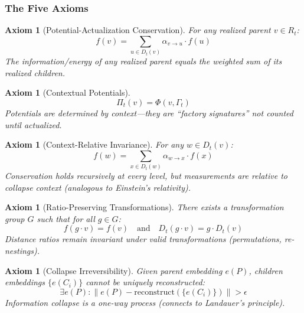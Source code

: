 \documentclass[11pt,a4paper]{article}
\newtheorem{axiom}[theorem]{Axiom}
\newcommand{\norm}[1]{\|#1\|}
\begin{document}
\subsubsection{The Five Axioms}

\begin{axiom}[Potential-Actualization Conservation]
\label{ax:pac}
For any realized parent $v \in R_t$:
\begin{equation}
f(v) = \sum_{u \in D_t(v)} \alpha_{v \to u} \cdot f(u)
\end{equation}
The information/energy of any realized parent equals the weighted sum of its realized children.
\end{axiom}

\begin{axiom}[Contextual Potentials]
\label{ax:context}
\begin{equation}
\Pi_t(v) = \Phi(v, \Gamma_t)
\end{equation}
Potentials are determined by context---they are ``factory signatures'' not counted until actualized.
\end{axiom}

\begin{axiom}[Context-Relative Invariance]
\label{ax:relativity}
For any $w \in D_t(v)$:
\begin{equation}
f(w) = \sum_{x \in D_t(w)} \alpha_{w \to x} \cdot f(x)
\end{equation}
Conservation holds recursively at every level, but measurements are relative to collapse context (analogous to Einstein's relativity).
\end{axiom}

\begin{axiom}[Ratio-Preserving Transformations]
\label{ax:symmetry}
There exists a transformation group $G$ such that for all $g \in G$:
\begin{equation}
f(g \cdot v) = f(v) \quad \text{and} \quad D_t(g \cdot v) = g \cdot D_t(v)
\end{equation}
Distance ratios remain invariant under valid transformations (permutations, re-nestings).
\end{axiom}

\begin{axiom}[Collapse Irreversibility]
\label{ax:irreversibility}
Given parent embedding $e(P)$, children embeddings $\{e(C_i)\}$ cannot be uniquely reconstructed:
\begin{equation}
\exists e(P) : \norm{e(P) - \text{reconstruct}(\{e(C_i)\})} > \epsilon
\end{equation}
Information collapse is a one-way process (connects to Landauer's principle).
\end{axiom}
\end{document}
